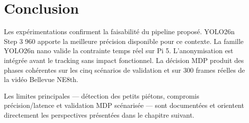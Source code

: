 \section*{Conclusion}

Les expérimentations confirment la
faisabilité du pipeline proposé. YOLO26n
Step 3 960 apporte la meilleure précision
disponible pour ce contexte. La famille
YOLO26n nano valide la contrainte temps
réel sur Pi 5. L'anonymisation est
intégrée avant le tracking sans impact
fonctionnel. La décision MDP produit des phases
cohérentes sur les cinq scénarios
de validation et sur 300 frames
réelles de la vidéo Bellevue NE8th.

Les limites principales — détection des
petits piétons, compromis précision/latence
et validation MDP scénarisée — sont
documentées et orientent directement
les perspectives présentées dans le
chapitre suivant.